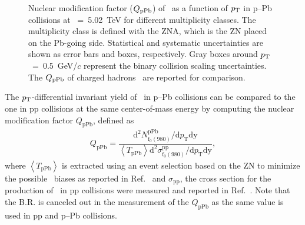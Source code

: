 \begin{figure}[!hbt]
	\centering
	\caption{ Nuclear modification factor ($Q_{\rm{pPb}}$) of \fzero~as a function of $p_{\rm{T}}$ in p--Pb collisions at \snn~=~5.02~TeV for different multiplicity classes. The multiplicity class is defined with the ZNA, which is the ZN placed on the Pb-going side. Statistical and systematic uncertainties are shown as error bars and boxes, respectively. Gray boxes around $p_{\rm{T}}$~=~0.5~GeV/$c$ represent the binary collision scaling uncertainties. The $Q_{\rm{pPb}}$ of charged hadrons~\cite{ALICE:2014xsp} are reported for comparison. }
	\label{fig:QpPb}
\end{figure}

The $p_{\rm{T}}$-differential invariant yield of \fzero~in p--Pb collisions can be compared to the one in pp collisions at the same center-of-mass energy by computing the nuclear modification factor $Q_{\mbox{pPb}}$, defined as 
\begin{eqnarray}
Q_{\mbox{pPb}} = \dfrac{\mathrm{d}^{2} N_{\mathrm{f}_{0}(980)}^{\mathrm{pPb}} / \mathrm{d} p_{\mathrm{T}} \mathrm{dy} }{ \left\langle T_{\mathrm{pPb}} \right\rangle \mathrm{d}^{2} \sigma_{\mathrm{f}_{0}(980)}^{\mathrm{pp}}/ \mathrm{d} p_{\mathrm{T}} \mathrm{dy} },
\end{eqnarray}
where $\left\langle T_{\mathrm{pPb}} \right\rangle$ is extracted using an event selection based on the ZN to minimize the possible \fzero~biases as reported in Ref.~\cite{ALICE:2014xsp} and $\sigma_{\mathrm{pp}}$, the cross section for the production of \fzero~in pp collisions were measured and reported in Ref.~\cite{ALICE:2022qnb}. Note that the B.R. is canceled out in the measurement of the $Q_{\mbox{pPb}}$ as the same value is used in pp and p--Pb collisions.


